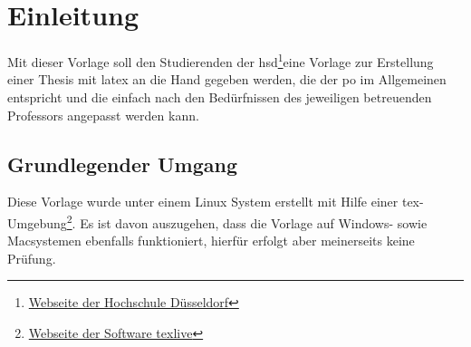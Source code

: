 \newpage
\section{Einleitung}
Mit dieser Vorlage soll den Studierenden der \gls{hsd}\footnote{\href{https://www.hs-duesseldorf.de}{Webseite der Hochschule Düsseldorf}}eine Vorlage zur Erstellung einer Thesis mit \gls{latex} an die Hand gegeben werden, die der \gls{po} im Allgemeinen entspricht und die einfach nach den Bedürfnissen des jeweiligen betreuenden Professors angepasst werden kann.

\subsection{Grundlegender Umgang}
Diese Vorlage wurde unter einem Linux System erstellt mit Hilfe einer tex-Umgebung\footnote{\href{https://tug.org/texlive/}{Webseite der Software texlive}}. Es ist davon auszugehen, dass die Vorlage auf Windows- sowie Macsystemen ebenfalls funktioniert, hierfür erfolgt aber meinerseits keine Prüfung.
